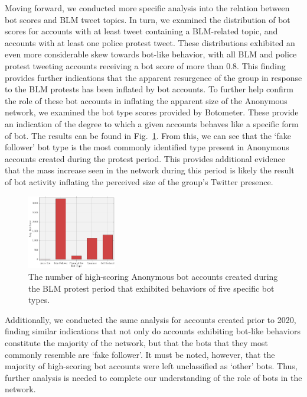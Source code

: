 \documentclass[letterpaper]{article}
\begin{document}
Moving forward, we conducted more specific analysis into the relation between bot scores and BLM tweet topics. In turn, we examined the distribution of bot scores for accounts with at least tweet containing a BLM-related topic, and accounts with at least one police protest tweet. These distributions exhibited an even more considerable skew towards bot-like behavior, with all BLM and police protest tweeting accounts receiving a bot score of more than 0.8. This finding provides further indications that the apparent resurgence of the group in response to the BLM protests has been inflated by bot accounts.  To further help confirm the role of these bot accounts in inflating the apparent size of the Anonymous network, we examined the bot type scores provided by Botometer. These provide an indication of the degree to which a given accounts behaves like a specific form of bot. The results can be found in Fig.~\ref{fig:botTypes}. From this, we can see that the `fake follower' bot type is the most commonly identified type present in Anonymous accounts created during the protest period. This provides additional evidence that the mass increase seen in the network during this period is likely the result of bot activity inflating the perceived size of the group's Twitter presence.

\begin{figure}[!ht]
\centering
\includegraphics[width=0.54\linewidth,height=1.27in ]{bot_types.pdf}
\caption{The number of high-scoring Anonymous bot accounts created during the BLM protest period that exhibited behaviors of five specific bot types.}
\label{fig:botTypes}
\end{figure}

\vspace{-2.05mm}
Additionally, we conducted the same analysis for accounts created prior to 2020, finding similar indications that not only do accounts exhibiting bot-like behaviors constitute the majority of the network, but that the bots that they most commonly resemble are `fake follower'. It must be noted, however, that the majority of high-scoring bot accounts were left unclassified as `other' bots. Thus, further analysis is needed to complete our understanding of the role of bots in the network.
\end{document}

